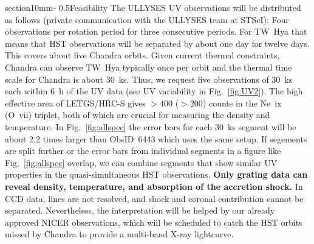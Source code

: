 \documentclass[letterpaper,11pt,twocolumn]{article}
\makeatletter
\renewcommand{\section}{\@startsection%
{section}{1}{0mm}{-\baselineskip}%
{0.5\baselineskip}{\normalfont\Large\bfseries}}%
\makeatother
\begin{document}
\section{Feasibility}
The ULLYSES UV observations will
be distributed as follows (private communication with the ULLYSES team
at STScI): Four observations per rotation period for three consecutive
periods. For TW~Hya that means that HST observations will be separated
by about one day for twelve days. This covers about five Chandra
orbits. Given current thermal constraints, Chandra can observe TW~Hya
typically once per orbit and the thermal time scale for Chandra is
about 30~ks. Thus, we request five observations of 30~ks each within 6~h of the UV data (see UV
variability in Fig.~\ref{fig:UV2}). The
high effective area of LETGS/HRC-S gives $> 400$ ($>200$) counts in
the Ne~{\sc ix} (O~{\sc vii}) triplet, both of which are crucial for
measuring the density and temperature.  In Fig.~\ref{fig:allspec} the
error bars for each 30~ks segment will be about 2.2 times larger than
ObsID~6443 which uses the same setup. If segements are split further
or the error bars from individual segments in a figure like
Fig.~\ref{fig:allspec} overlap, we can combine segments that show
similar UV properties in the quasi-simultaneous HST observations.
\textbf{Only grating data can reveal density, temperature, and
  absorption of the accretion shock.}  In CCD data, lines are not
resolved, and shock and coronal contribution cannot be
separated. Nevertheless, the interpretation will be helped by our
already approved NICER observations, which will be scheduled to catch
the HST orbits missed by Chandra to provide a multi-band X-ray
lightcurve.
 







%
\end{document}
